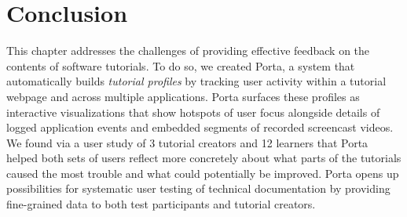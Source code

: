 \section{Conclusion}

This chapter addresses the challenges of providing effective feedback on
the contents of software tutorials. To do so, we created Porta, a system
that automatically builds \emph{tutorial profiles} by tracking user activity within a tutorial webpage and across multiple applications.
Porta surfaces these profiles as interactive visualizations that show
hotspots of user focus alongside details of logged application events
and embedded segments of recorded screencast videos. We found via a user
study of 3 tutorial creators and 12 learners that Porta helped both sets
of users reflect more concretely about what parts of the tutorials
caused the most trouble and what could potentially be improved. Porta
opens up possibilities for systematic user testing of technical
documentation by providing fine-grained data to both test participants
and tutorial creators.

